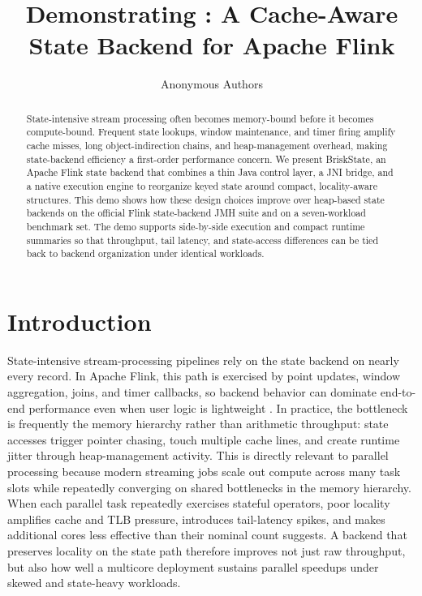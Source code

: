 \documentclass[sigconf,nonacm]{acmart}
\title{Demonstrating \briskstate: A Cache-Aware State Backend for Apache Flink}
\author{Anonymous Authors}
\affiliation{%
  \institution{Anonymous Submission}%
  \city{Anonymous}%
  \country{Anonymous}%
}
\newcommand{\briskstate}{BriskState\xspace}
\begin{document}
\begin{abstract}
State-intensive stream processing often becomes memory-bound before it becomes compute-bound. Frequent state lookups, window maintenance, and timer firing amplify cache misses, long object-indirection chains, and heap-management overhead, making state-backend efficiency a first-order performance concern. We present \briskstate, an Apache Flink state backend that combines a thin Java control layer, a JNI bridge, and a native execution engine to reorganize keyed state around compact, locality-aware structures. This demo shows how these design choices improve over heap-based state backends on the official Flink state-backend JMH suite and on a seven-workload benchmark set. The demo supports side-by-side execution and compact runtime summaries so that throughput, tail latency, and state-access differences can be tied back to backend organization under identical workloads.
\end{abstract}


\maketitle

\section{Introduction}
State-intensive stream-processing pipelines rely on the state backend on nearly every record. In Apache Flink, this path is exercised by point updates, window aggregation, joins, and timer callbacks, so backend behavior can dominate end-to-end performance even when user logic is lightweight \cite{carbone2015flink}. In practice, the bottleneck is frequently the memory hierarchy rather than arithmetic throughput: state accesses trigger pointer chasing, touch multiple cache lines, and create runtime jitter through heap-management activity. This is directly relevant to parallel processing because modern streaming jobs scale out compute across many task slots while repeatedly converging on shared bottlenecks in the memory hierarchy. When each parallel task repeatedly exercises stateful operators, poor locality amplifies cache and TLB pressure, introduces tail-latency spikes, and makes additional cores less effective than their nominal count suggests. A backend that preserves locality on the state path therefore improves not just raw throughput, but also how well a multicore deployment sustains parallel speedups under skewed and state-heavy workloads.
\end{document}
